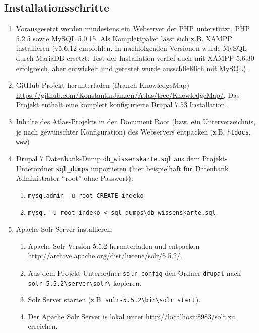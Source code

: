 \subsection{Installationsschritte}
\begin{enumerate}
	\item Vorausgesetzt werden mindestens ein Webserver der PHP unterstützt, PHP 5.2.5 sowie MySQL 5.0.15. Als Komplettpaket lässt sich z.B. \href{https://www.apachefriends.org/de/download.html}{XAMPP} installieren (v5.6.12 empfohlen. In nachfolgenden Versionen wurde MySQL durch MariaDB ersetzt. Test der Installation verlief auch mit XAMPP 5.6.30 erfolgreich, aber entwickelt und getestet wurde ausschließlich mit MySQL).
	
	\item GitHub-Projekt herunterladen (Branch KnowledgeMap) \url{https://github.com/KonstantinJanzen/Atlas/tree/KnowledgeMap/}.
	Das Projekt enthält eine komplett konfigurierte Drupal 7.53 Installation.
	
	\item Inhalte des Atlas-Projekts in den Document Root (bzw. ein Unterverzeichnis, je nach gewünschter Konfiguration) des Webservers entpacken (z.B. \lstinline|htdocs|, \lstinline|www|)
	
	\item Drupal 7 Datenbank-Dump \lstinline|db_wissenskarte.sql| aus dem Projekt-Unterordner \lstinline|sql_dumps| importieren (hier beispielhaft für Datenbank Administrator \enquote{root} ohne Passwort):
	\begin{enumerate}
		\item \lstinline|mysqladmin -u root CREATE indeko|
		
		\item \lstinline|mysql -u root indeko < sql_dumps\db_wissenskarte.sql|
	\end{enumerate}
	
	\item Apache Solr Server installieren:
	\begin{enumerate}
		\item Apache Solr Version 5.5.2 herunterladen und entpacken \url{http://archive.apache.org/dist/lucene/solr/5.5.2/}.
		
		\item Aus dem Projekt-Unterordner \lstinline|solr_config| den Ordner \lstinline|drupal| nach \lstinline|solr-5.5.2\server\solr\| kopieren.
		
		\item Solr Server starten (z.B. \lstinline|solr-5.5.2\bin\solr start|).
		\item Der Apache Solr Server is lokal unter \url{http://localhost:8983/solr} zu erreichen.
	\end{enumerate}
	

\end{enumerate}
